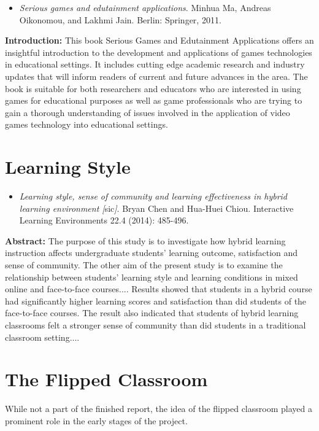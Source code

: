 \documentclass[12pt,a4paper,twoside]{report}
\begin{document}
\begin{itemize}
	\item \textit{Serious games and edutainment applications}. Minhua Ma, Andreas Oikonomou, and Lakhmi Jain.  Berlin: Springer, 2011.
\end{itemize}

\noindent \textbf{Introduction:} This book Serious Games and Edutainment Applications offers an insightful introduction to the development and applications of games technologies in educational settings. It includes cutting edge academic research and industry updates that will inform readers of current and future advances in the area. The book is suitable for both researchers and educators who are interested in using games for educational purposes as well as game professionals who are trying to gain a thorough understanding of issues involved in the application of video games technology into educational settings.

\clearpage

\section{Learning Style}
\begin{itemize}
	\item \textit{Learning style, sense of community and learning effectiveness in hybrid learning environment [}sic\textit{]}. Bryan Chen and Hua-Huei Chiou. Interactive Learning Environments 22.4 (2014): 485-496.
\end{itemize}

\noindent \textbf{Abstract:} The purpose of this study is to investigate how hybrid learning instruction affects undergraduate students’ learning outcome, satisfaction and sense of community. The other aim of the present study is to examine the relationship between students’ learning style and learning conditions in mixed online and face-to-face courses.... Results showed that students in a hybrid course had significantly higher learning scores and satisfaction than did students of the face-to-face courses. The result also indicated that students of hybrid learning classrooms felt a stronger sense of community than did students in a traditional classroom setting....

\section{The Flipped Classroom}
While not  a part of the finished report, the idea of the flipped classroom played a prominent role in the early stages of the project.
\end{document}
